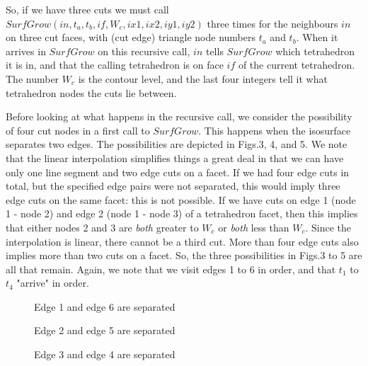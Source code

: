 \documentclass[12pt]{article}
\begin{document}
So, if we have three cuts we must call $SurfGrow(in,t_a,t_b,if,W_c, ix1, ix2, iy1, iy2)$
three times for the neighbours $in$ on three cut faces, with (cut edge) triangle
node numbers $t_a$ and $t_b$. When it arrives in $SurfGrow$ on this recursive
call, $in$ tells $SurfGrow$ which tetrahedron it is in,
 and that the calling tetrahedron is on face $if$ of the current
tetrahedron. The number $W_c$ is the contour level, and the last four integers
tell it what tetrahedron nodes the cuts lie between.

Before looking at what happens in the recursive call, we consider the
possibility of four cut nodes in a first call to $SurfGrow$. This happens
when the isosurface separates two edges. The possibilities are depicted
 in Figs.3, 4, and 5. We note that the linear interpolation simplifies
things a great deal in that we can have only one line segment and two
edge cuts on a facet. If we had four edge cuts in total, but
the specified  edge pairs were not separated, this would imply
three edge cuts on the same facet:
 this is not possible. If we have cuts on edge 1 (node 1 - node 2) and 
edge 2 (node 1 - node 3) of a tetrahedron
facet, then this implies that either nodes 2 and 3 are {\it both}
greater to $W_c$ or {\it both} less than $W_c$. Since the
interpolation is linear, there cannot be a third cut.
More than four edge cuts also implies more than two cuts on a facet.
So, the three possibilities in Figs.3 to 5 are all that remain.
Again, we note that we visit edges 1 to 6 in order, and that
 $t_1$ to $t_4$ "arrive" in order.


\begin{figure}
\vspace*{14cm}
\caption{Edge 1 and edge 6 are separated}
\end{figure}
\begin{figure}
\vspace*{14cm}
\caption{Edge 2 and edge 5 are separated}
\end{figure}
\begin{figure}
\vspace*{14cm}
\caption{Edge 3 and edge 4 are separated}
\end{figure}
\end{document}
